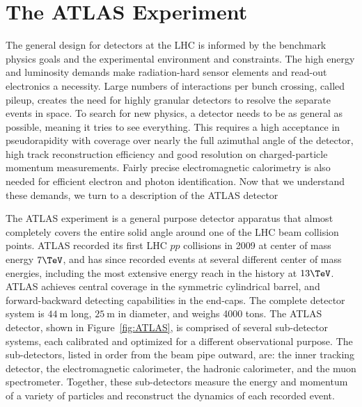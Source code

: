 \section{The ATLAS Experiment}
\label{sec:ATLAS}
The general design for detectors at the LHC is informed by the benchmark physics goals and the experimental environment and constraints.  The high energy and luminosity demands make radiation-hard sensor elements and read-out electronics a necessity.  Large numbers of interactions per bunch crossing, called pileup, creates the need for highly granular detectors to resolve the separate events in space.  To search for new physics, a detector needs to be as general as possible, meaning it tries to see everything.  This requires a high acceptance in pseudorapidity with coverage over nearly the full azimuthal angle of the detector, high track reconstruction efficiency and good resolution on charged-particle momentum measurements.  Fairly precise electromagnetic calorimetry is also needed for efficient electron and photon identification.  Now that we understand these demands, we turn to a description of the ATLAS detector 

The ATLAS experiment is a general purpose detector apparatus that almost completely covers the entire solid angle around one of the LHC beam collision points.  ATLAS recorded its first LHC $pp$ collisions in 2009 at center of mass energy $7\TeV$, and has since recorded events at several different center of mass energies, including the most extensive energy reach in the history at $13\TeV$.  %
ATLAS achieves central coverage in the symmetric cylindrical barrel, and forward-backward detecting capabilities in the end-caps.  The complete detector system is $44~\mathrm{m}$ long, $25~\mathrm{m}$ in diameter, and weighs 4000 tons.  The ATLAS detector, shown in Figure~\ref{fig:ATLAS}, is comprised of several sub-detector systems, each calibrated and optimized for a different observational purpose.  The sub-detectors, listed in order from the beam pipe outward, are: the inner tracking detector, the electromagnetic calorimeter, the hadronic calorimeter, and the muon spectrometer.  Together, these sub-detectors measure the energy and momentum of a variety of particles and reconstruct the dynamics of each recorded event.  

